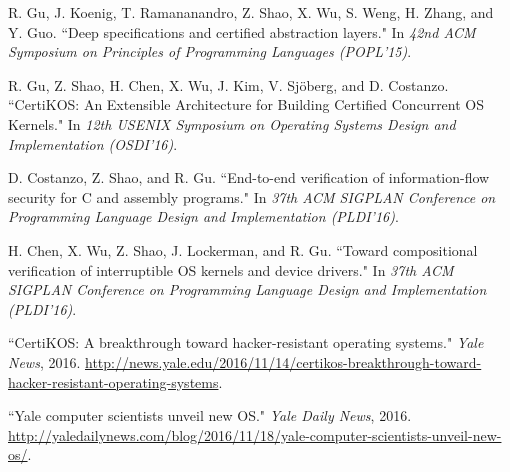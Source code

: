 \documentclass[a4paper, 10pt]{article}
\begin{document}
\begin{footnotesize}
\begin{thebibliography}{}




R. Gu, J. Koenig, T. Ramananandro, Z. Shao, X. Wu, S. Weng, H. Zhang, and Y. Guo. ``Deep specifications and certified abstraction layers." In
\emph{42nd ACM Symposium on Principles of Programming
Languages (POPL'15)}.

R. Gu, Z. Shao, H. Chen, X. Wu, J. Kim, V. Sj\"{o}berg, and D. Costanzo. ``CertiKOS: An Extensible Architecture for Building Certified Concurrent OS Kernels." In \emph{12th USENIX Symposium on Operating Systems Design and Implementation (OSDI'16)}. 

D. Costanzo,  Z. Shao, and R. Gu. ``End-to-end verification of information-flow security for C and assembly programs." In 
\emph{37th ACM SIGPLAN Conference on Programming Language Design and Implementation (PLDI'16)}.

H. Chen,  X. Wu, Z. Shao, J. Lockerman, and R. Gu. ``Toward compositional verification of interruptible OS kernels and device drivers." In \emph{37th ACM SIGPLAN Conference on Programming Language Design and Implementation (PLDI'16)}.



``CertiKOS: A breakthrough toward hacker-resistant operating systems." \emph{Yale News}, 2016.
\url{http://news.yale.edu/2016/11/14/certikos-breakthrough-toward-hacker-resistant-operating-systems}.

``Yale computer scientists unveil new OS." \emph{Yale Daily News}, 2016.
\url{http://yaledailynews.com/blog/2016/11/18/yale-computer-scientists-unveil-new-os/}.



\end{thebibliography}
\end{footnotesize}
\end{document}
